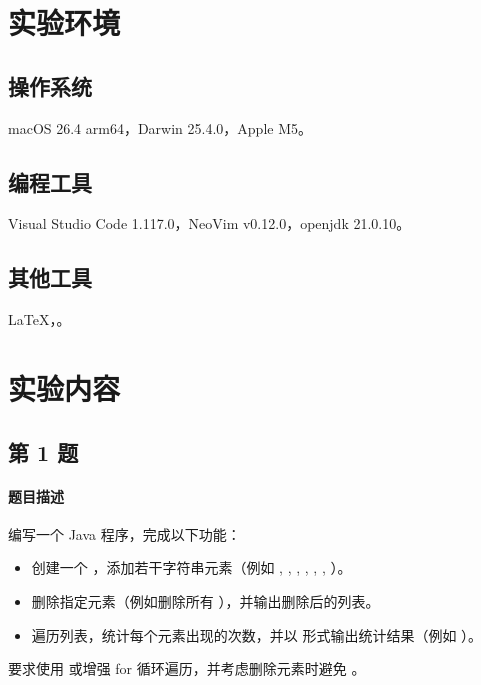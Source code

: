 \documentclass{academics}
\begin{document}
\makeacademicscover

\section{实验环境}

\subsection{操作系统}

macOS 26.4 arm64，Darwin 25.4.0，Apple M5。

\subsection{编程工具}

Visual Studio Code 1.117.0，NeoVim v0.12.0，openjdk 21.0.10。

\subsection{其他工具}

\LaTeX{}，。

\section{实验内容}

\subsection{第 1 题}

\paragraph{题目描述} {
    编写一个 Java 程序，完成以下功能：
    \begin{itemize}
        \item 创建一个 ，添加若干字符串元素（例如 , , , , , , ）。
        \item 删除指定元素（例如删除所有 ），并输出删除后的列表。
        \item 遍历列表，统计每个元素出现的次数，并以  形式输出统计结果（例如 ）。
    \end{itemize}
    要求使用  或增强 for 循环遍历，并考虑删除元素时避免 。
}
\end{document}
